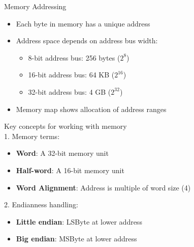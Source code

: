 \begin{concept}{Memory Addressing}
\begin{itemize}
  \item Each byte in memory has a unique address
  \item Address space depends on address bus width:
    \begin{itemize}
      \item 8-bit address bus: 256 bytes ($2^8$)
      \item 16-bit address bus: 64 KB ($2^{16}$)
      \item 32-bit address bus: 4 GB ($2^{32}$)
    \end{itemize}
  \item Memory map shows allocation of address ranges
\end{itemize}
\end{concept}

\begin{KR}{Key concepts for working with memory}\\
1. Memory terms:
\begin{itemize}
  \item \textbf{Word}: A 32-bit memory unit
  \item \textbf{Half-word}: A 16-bit memory unit
  \item \textbf{Word Alignment}: Address is multiple of word size (4)
\end{itemize}

2. Endianness handling:
\begin{itemize}
  \item \textbf{Little endian}: LSByte at lower address
  \item \textbf{Big endian}: MSByte at lower address
\end{itemize}
\end{KR}

